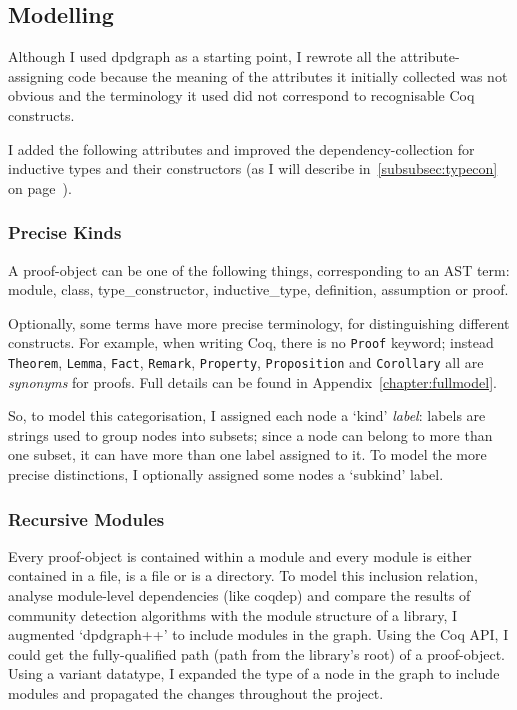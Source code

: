 \subsection{Modelling}\label{subsec:modelling}

Although I used dpdgraph as a starting point, I rewrote all the
attribute-assigning code because the meaning of the attributes it initially
collected was not obvious and the terminology it used did not correspond to
recognisable Coq constructs.

I added the following attributes and improved the dependency-collection for
inductive types and their constructors (as I will describe
in~\ref{subsubsec:typecon}~ on
page~\pageref{subsubsec:typecon}).

\subsubsection{Precise Kinds}\label{subsubsec:kinds}

A proof-object can be one of the following things, corresponding to an AST term:
\textsf{module}, \textsf{class}, \textsf{type\_constructor},
\textsf{inductive\_type}, \textsf{definition}, \textsf{assumption} or
\textsf{proof}.

Optionally, some terms have more precise terminology, for distinguishing
different constructs. For example, when writing Coq, there is no \texttt{Proof}
keyword; instead \texttt{Theorem}, \texttt{Lemma}, \texttt{Fact},
\texttt{Remark}, \texttt{Property}, \texttt{Proposition} and \texttt{Corollary}
all are \emph{synonyms} for proofs. Full details can be found in
Appendix~\ref{chapter:fullmodel}.

So, to model this categorisation, I assigned each node a `kind' \emph{label}:
labels are strings used to group nodes into subsets; since a node can belong to
more than one subset, it can have more than one label assigned to it. To model
the more precise distinctions, I optionally assigned some nodes a `subkind'
label.

\subsubsection{Recursive Modules}\label{subsubsec:recmodules}

Every proof-object is contained within a module and every module is either
contained in a file, is a file or is a directory. To model this inclusion
relation, analyse module-level dependencies (like coqdep) and compare the
results of community detection algorithms with the module structure of a
library, I augmented `dpdgraph++' to include modules in the graph. Using the
Coq API, I could get the fully-qualified path (path from the library's root) of
a proof-object. Using a variant datatype, I expanded the type of a node in the
graph to include modules and propagated the changes throughout the project.

